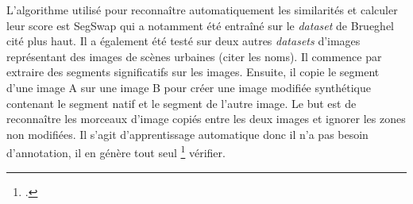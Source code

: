 L'algorithme utilisé pour reconnaître automatiquement les similarités et calculer leur score est SegSwap qui a notamment été entraîné sur le \textit{dataset} de Brueghel cité plus haut. Il a également été testé sur deux autres \textit{datasets} d'images représentant des images de scènes urbaines (citer les noms). Il commence par extraire des segments significatifs sur les images. Ensuite, il copie le segment d'une image A sur une image B pour créer une image modifiée synthétique contenant le segment natif et le segment de l'autre image. Le but est de reconnaître les morceaux d'image copiés entre les deux images et ignorer les zones non modifiées.  Il s'agit d'apprentissage automatique donc il n'a pas besoin d'annotation, il en génère tout seul \footcite{shenLearningCosegmentationSegment2022} vérifier. 

 

